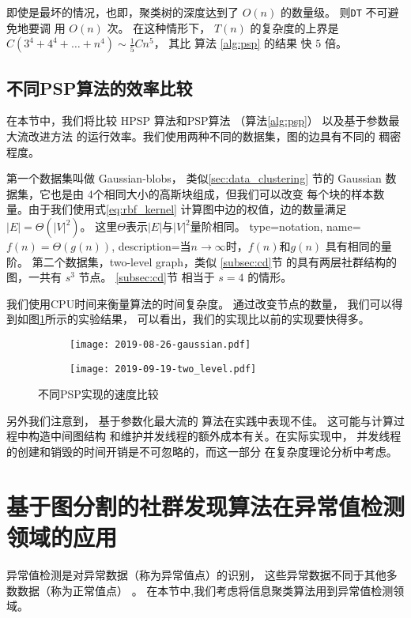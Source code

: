 即使是最坏的情况，也即，聚类树的深度达到了 $O(n)$ 的数量级。
则\texttt{DT} 不可避免地要调 用 $O(n)$ 次。
在这种情形下，
$T(n)$ 的复杂度的上界是 $C(3^4+4^4 + \dots + n^4) \sim \frac{1}{5}Cn^5$，
其比 算法 \ref{alg:psp} 的结果
快 $5$ 倍。

\subsection{不同PSP算法的效率比较}
在本节中，我们将比较 HPSP 算法和PSP算法
（算法\ref{alg:psp}）
以及基于参数最大流改进方法\cite{kolmogorov}
的运行效率。我们使用两种不同的数据集，图的边具有不同的
稠密程度。

第一个数据集叫做 Gaussian-blobs，
类似\ref{sec:data_clustering}
节的 Gaussian 数据集，它也是由
4个相同大小的高斯块组成，但我们可以改变
每个块的样本数量。由于我们使用式\ref{eq:rbf_kernel}
计算图中边的权值，边的数量满足 $|E|=\Theta(|V|^2)$。
这里$\Theta$表示$|E|$与$|V|^2$量阶相同。
{
  type=notation,
  name={$f(n)=\Theta(g(n))$},
  description={当$n\to \infty$时，$f(n)$和$g(n)$ 具有相同的量阶。}
}
第二个数据集，two-level graph，类似 \ref{subsec:cd}节
的具有两层社群结构的图，一共有 $s^3$ 节点。
\ref{subsec:cd}节 相当于 $s=4$ 的情形。

我们使用CPU时间来衡量算法的时间复杂度。
通过改变节点的数量，
我们可以得到如图\ref{fig:esc}所示的实验结果，
可以看出，我们的实现比以前的实现要快得多。
\begin{figure}
	\centering
	\begin{subfigure}{0.45\textwidth}
		\texttt{[image: 2019-08-26-gaussian.pdf]}
	\end{subfigure}
	\begin{subfigure}{0.45\textwidth}
		\texttt{[image: 2019-09-19-two\_level.pdf]}
	\end{subfigure}
	\caption{
  不同PSP实现的速度比较}\label{fig:esc}
\end{figure}

另外我们注意到，
基于参数化最大流的
算法\citep{kolmogorov}在实践中表现不佳。
这可能与计算过程中构造中间图结构
和维护并发线程的额外成本有关。在实际实现中，
并发线程的创建和销毁的时间开销是不可忽略的，而这一部分
在复杂度理论分析中考虑。

\section{基于图分割的社群发现算法在异常值检测领域的应用}
异常值检测是对异常数据（称为异常值点）的识别，
这些异常数据不同于其他多数数据（称为正常值点）
\citep{grubbs1969procedures}。
在本节中,我们考虑将信息聚类算法用到异常值检测领域。

